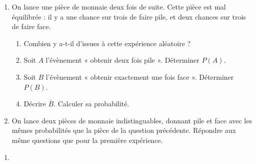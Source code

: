 \documentclass[11pt]{article}
\begin{document}
\begin{exercice}
  \begin{em}
    \begin{enumerate}
      \item On lance une pièce de monnaie deux fois de suite. Cette pièce est mal équilibrée : il y a une chance sur trois de faire pile, et deux chances sur trois de faire face.
        \begin{enumerate}
          \item Combien y a-t-il d'issues à cette expérience aléatoire ?
          \item Soit $A$ l'évènement « obtenir deux fois pile ». Déterminer $P(A)$.
          \item Soit $B$ l'évènement « obtenir exactement une fois face ». Déterminer $P(B)$.
          \item Décrire $\bar B$. Calculer sa probabilité.
        \end{enumerate}
      \item On lance deux pièces de monnaie indistinguables, donnant pile et face avec les mêmes probabilités que la pièce de la question précédente. Répondre aux même questions que pour la première expérience.
    \end{enumerate}
  \end{em}

  \newpage

  \begin{enumerate}
    \item~
      \begin{multicols}{2}
        \begin{center}
        \end{center}


\end{multicols}
\end{enumerate}
\end{exercice}
\end{document}
